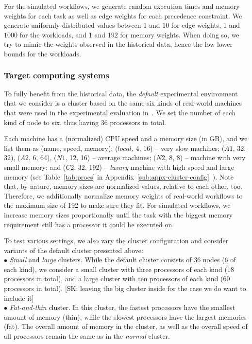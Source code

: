 \documentclass[conference]{IEEEtran}
\newcommand{\skug}[1]{{\color{blue}[SK: #1]}}
\begin{document}
    For the simulated workflows, we generate random execution times and memory weights for each task as well as
    edge weights for each precedence constraint.
    We generate uniformly distributed values between $1$ and $10$ for edge weights,
    $1$ and $1000$ for the workloads,
    and $1$ and $192$ for memory weights.
    When doing so, we try to mimic the weights observed in the historical data, hence \eg the low lower bounds for the
    workloads.


    \subsubsection{Target computing systems}
    To fully benefit from the historical data, the  {\em default} experimental environment
    that we consider is a cluster based on the same six
    kinds of real-world machines that were used in the experimental evaluation in~\cite{lotaru}.
    We set the number of each kind of node to six, thus having 36 processors in total. %

    Each machine has a (normalized) CPU speed and a memory size (in GB), and we list them as (name, speed, memory):
    ($local$, 4, 16) -- very slow machines; ($A1$, 32, 32), ($A2$, 6, 64), ($N1$, 12, 16) -- average machines; ($N2$, 8, 8) -- machine with very small memory; and ($C2$, 32, 192) -- {\em luxury} machine with high speed and large memory
    (see Table~\ref{tab:procs} in Appendix~\ref{sub:appx-cluster-config}~\cite{daghetpart_full_version}).
    Note that, by nature,
    memory sizes are normalized values, relative to each other, too.
    Therefore, we additionally normalize memory weights of real-world workflows
    to the maximum size of 192 to make sure they fit.
    For simulated workflows, we increase memory sizes proportionally until the task
    with the biggest memory requirement still
    has a processor it could be executed on.

    To test various settings, we also vary the cluster configuration and consider
    variants of the default cluster presented above:\\
    $\bullet$ {\em Small} and {\em large} clusters. While the default cluster consists of 36 nodes (6 of each kind), we
    consider a small cluster with three processors of each kind ($18$ processors in total), and a
    large cluster with ten processors of each kind ($60$ processors in total). \skug{leaving the big cluster inside for
    the case we do want to include it}\\
    $\bullet$ {\em Fat-and-thin} cluster. In this cluster, the fastest processors have the smallest amount of memory (thin),
    while the slowest processors have the largest memories (fat).
    The overall amount of memory in the cluster, as well as the overall speed of all processors remain the same as in the
            {\em normal} cluster.
\end{document}

